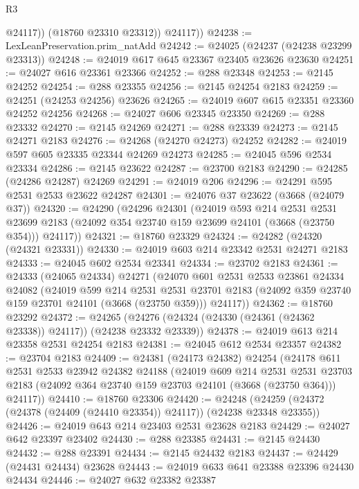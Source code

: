 \begin{lexlean}{R3}
\begin{coremodule}
              @24117))
          (@18760 @23310 @23312))
        @24117))
@24238 := LexLeanPreservation.prim_natAdd
@24242 := @24025 (@24237 (@24238 @23299 @23313))
@24248 := @24019 @617 @645 @23367 @23405 @23626 @23630
@24251 := @24027 @616 @23361 @23366
@24252 := @288 @23348
@24253 := @2145 @24252
@24254 := @288 @23355
@24256 := @2145 @24254 @2183
@24259 := @24251 (@24253 @24256) @23626
@24265 := @24019 @607 @615 @23351 @23360 @24252 @24256
@24268 := @24027 @606 @23345 @23350
@24269 := @288 @23332
@24270 := @2145 @24269
@24271 := @288 @23339
@24273 := @2145 @24271 @2183
@24276 := @24268 (@24270 @24273) @24252
@24282 := @24019 @597 @605 @23335 @23344 @24269 @24273
@24285 := @24045 @596 @2534 @23334
@24286 := @2145 @23622
@24287 := @23700 @2183
@24290 := @24285 (@24286 @24287) @24269
@24291 := @24019 @206
@24296 := @24291 @595 @2531 @2533 @23622 @24287
@24301 := @24076 @37 @23622 (@3668 (@24079 @37))
@24320 := @24290
    (@24296
      @24301
      (@24019
        @593
        @214
        @2531
        @2531
        @23699
        @2183
        (@24092 @354 @23740 @159 @23699 @24101 (@3668 (@23750 @354)))
        @24117))
@24321 := @18760 @23329
@24324 := @24282 (@24320 (@24321 @23331))
@24330 := @24019 @603 @214 @23342 @2531 @24271 @2183
@24333 := @24045 @602 @2534 @23341
@24334 := @23702 @2183
@24361 := @24333
    (@24065 @24334)
    @24271
    (@24070
      @601
      @2531
      @2533
      @23861
      @24334
      @24082
      (@24019
        @599
        @214
        @2531
        @2531
        @23701
        @2183
        (@24092 @359 @23740 @159 @23701 @24101 (@3668 (@23750 @359)))
        @24117))
@24362 := @18760 @23292
@24372 := @24265 (@24276 (@24324 (@24330 (@24361 (@24362 @23338)) @24117)) (@24238 @23332 @23339))
@24378 := @24019 @613 @214 @23358 @2531 @24254 @2183
@24381 := @24045 @612 @2534 @23357
@24382 := @23704 @2183
@24409 := @24381
    (@24173 @24382)
    @24254
    (@24178
      @611
      @2531
      @2533
      @23942
      @24382
      @24188
      (@24019
        @609
        @214
        @2531
        @2531
        @23703
        @2183
        (@24092 @364 @23740 @159 @23703 @24101 (@3668 (@23750 @364)))
        @24117))
@24410 := @18760 @23306
@24420 := @24248 (@24259 (@24372 (@24378 (@24409 (@24410 @23354)) @24117)) (@24238 @23348 @23355))
@24426 := @24019 @643 @214 @23403 @2531 @23628 @2183
@24429 := @24027 @642 @23397 @23402
@24430 := @288 @23385
@24431 := @2145 @24430
@24432 := @288 @23391
@24434 := @2145 @24432 @2183
@24437 := @24429 (@24431 @24434) @23628
@24443 := @24019 @633 @641 @23388 @23396 @24430 @24434
@24446 := @24027 @632 @23382 @23387

\end{coremodule}
\end{lexlean}
